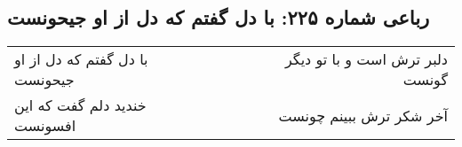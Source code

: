 \begin{center}
\section*{رباعی شماره ۲۲۵: با دل گفتم که دل از او جیحونست}
\label{sec:0225}
\begin{longtable}{l p{0.5cm} r}
با دل گفتم که دل از او جیحونست
&&
دلبر ترش است و با تو دیگر گونست
\\
خندید دلم گفت که این افسونست
&&
آخر شکر ترش ببینم چونست
\\
\end{longtable}
\end{center}
